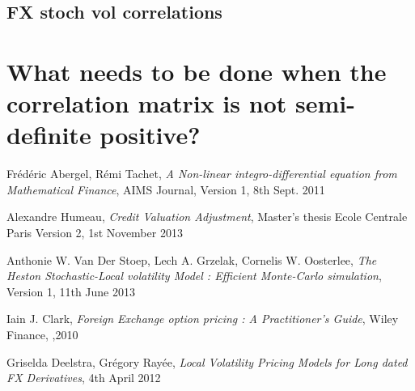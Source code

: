 \documentclass{article}
\begin{document}
\subsection{FX stoch vol correlations}

\section{What needs to be done when the correlation matrix is not semi-definite positive?}
\begin{thebibliography}{9}

  Frédéric Abergel, Rémi Tachet,
  \emph{A Non-linear integro-differential equation from Mathematical Finance},
  AIMS Journal,
  Version 1, 8th Sept. 2011

 Alexandre Humeau,
 \emph{Credit Valuation Adjustment},
 Master's thesis Ecole Centrale Paris
 Version 2, 
 1st November 2013

 Anthonie W. Van Der Stoep, Lech A. Grzelak, Cornelis W. Oosterlee,
 \emph{The Heston Stochastic-Local volatility Model : Efficient Monte-Carlo simulation},
 Version 1, 11th June 2013

 Iain J. Clark, 
 \emph{Foreign Exchange option pricing : A Practitioner's Guide},
 Wiley Finance,
 ,2010

 Griselda Deelstra, Grégory Rayée,
 \emph{Local Volatility Pricing Models for Long dated FX Derivatives},
 4th April 2012
\end{thebibliography}
\end{document}
